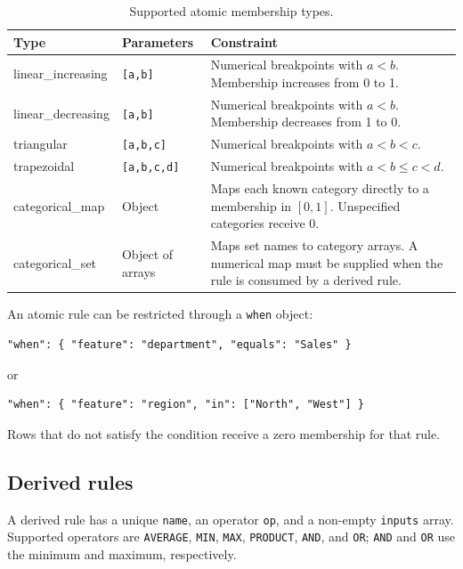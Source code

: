 \documentclass[11pt,a4paper]{article}
\begin{document}
\begin{table}[ht]
\centering
\caption{Supported atomic membership types.}
\begin{tabularx}{\textwidth}{>{\ttfamily\raggedright\arraybackslash}p{3.4cm} >{\raggedright\arraybackslash}p{3.3cm} >{\raggedright\arraybackslash}X}
\toprule
\normalfont\textbf{Type} & \textbf{Parameters} & \textbf{Constraint} \\
\midrule
linear\_increasing & \texttt{[a,b]} & Numerical breakpoints with $a<b$. Membership increases from 0 to 1. \\
linear\_decreasing & \texttt{[a,b]} & Numerical breakpoints with $a<b$. Membership decreases from 1 to 0. \\
triangular & \texttt{[a,b,c]} & Numerical breakpoints with $a<b<c$. \\
trapezoidal & \texttt{[a,b,c,d]} & Numerical breakpoints with $a<b\leq c<d$. \\
categorical\_map & Object & Maps each known category directly to a membership in $[0,1]$. Unspecified categories receive 0. \\
categorical\_set & Object of arrays & Maps set names to category arrays. A numerical map must be supplied when the rule is consumed by a derived rule. \\
\bottomrule
\end{tabularx}
\end{table}

An atomic rule can be restricted through a \texttt{when} object:
\begin{lstlisting}[style=json]
"when": { "feature": "department", "equals": "Sales" }
\end{lstlisting}
or
\begin{lstlisting}[style=json]
"when": { "feature": "region", "in": ["North", "West"] }
\end{lstlisting}
Rows that do not satisfy the condition receive a zero membership for that rule.

\subsection{Derived rules}

A derived rule has a unique \texttt{name}, an operator \texttt{op}, and a non-empty \texttt{inputs} array. Supported operators are \texttt{AVERAGE}, \texttt{MIN}, \texttt{MAX}, \texttt{PRODUCT}, \texttt{AND}, and \texttt{OR}; \texttt{AND} and \texttt{OR} use the minimum and maximum, respectively.
\end{document}
